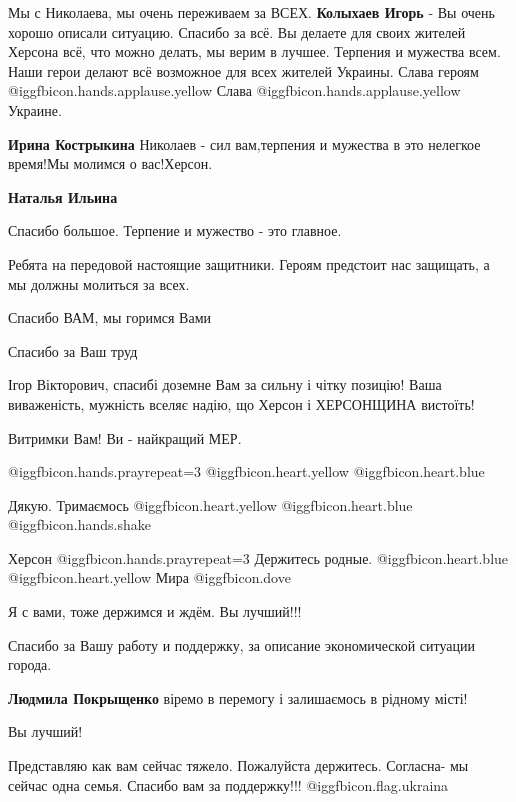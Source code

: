 \begin{itemize}

\obeycr
Мы с Николаева, мы очень переживаем за ВСЕХ.
\textbf{Колыхаев Игорь} - Вы очень хорошо описали ситуацию. Спасибо за всё.
Вы делаете для своих жителей Херсона всё, что можно делать, мы верим в лучшее.
Терпения и мужества всем.
Наши герои делают всё возможное для всех жителей Украины.
Слава героям  @igg{fbicon.hands.applause.yellow} 
Слава  @igg{fbicon.hands.applause.yellow}  Украине.
\restorecr

\textbf{Ирина Кострыкина} Николаев - сил вам,терпения и мужества в это нелегкое время!Мы молимся о вас!Херсон.

\textbf{Наталья Ильина} 

Спасибо большое. Терпение и мужество - это главное.

Ребята на передовой настоящие защитники. Героям предстоит нас защищать, а мы
должны молиться за всех.

Спасибо ВАМ, мы горимся Вами

Спасибо за Ваш труд


Ігор Вікторович, спасибі доземне Вам за сильну і чітку позицію! Ваша
виваженість, мужність вселяє надію, що Херсон і ХЕРСОНЩИНА вистоїть!

Витримки Вам! Ви - найкращий МЕР.

 @igg{fbicon.hands.pray}{repeat=3}  @igg{fbicon.heart.yellow}  @igg{fbicon.heart.blue} 

Дякую. Тримаємось @igg{fbicon.heart.yellow}  @igg{fbicon.heart.blue}  @igg{fbicon.hands.shake} 

Херсон @igg{fbicon.hands.pray}{repeat=3} Держитесь родные.  @igg{fbicon.heart.blue}  @igg{fbicon.heart.yellow}  Мира  @igg{fbicon.dove} 

Я с вами, тоже держимся и ждём. Вы лучший!!!

Спасибо за Вашу работу и поддержку, за описание экономической ситуации города.

\textbf{Людмила Покрыщенко} віремо в перемогу і залишаємось в рідному місті!

Вы лучший!


Представляю как вам сейчас тяжело. Пожалуйста держитесь. Согласна- мы сейчас
одна семья. Спасибо вам за поддержку!!! @igg{fbicon.flag.ukraina}


\end{itemize}
